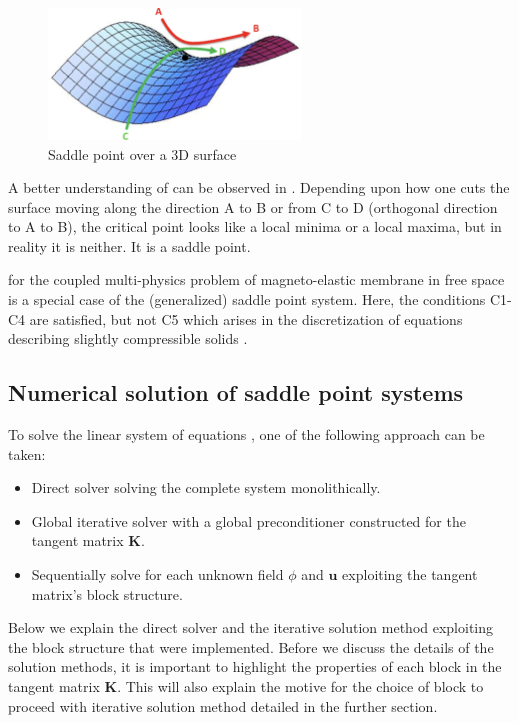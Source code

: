 \documentclass[11pt,a4paper,final]{article}
\begin{document}
\begin{figure}[h]
\centering
\includegraphics[width=0.6\textwidth]{saddle_point_problem.png}
\caption{Saddle point over a 3D surface \cite{Buduma_book}}
\label{fig:3.1}
\end{figure}

A better understanding of  can be observed in . Depending upon how one cuts the surface moving along the direction A to B or from C to D (orthogonal direction to A to B), the critical point looks like a local minima or a local maxima, but in reality it is neither. It is a saddle point. \par 

 for the coupled multi-physics problem of magneto-elastic membrane in free space is a special case of the (generalized) saddle point system. Here, the conditions C1-C4 are satisfied, but not C5 which arises in the discretization of equations describing slightly compressible solids \cite{Benzi2005}.

\subsection{Numerical solution of saddle point systems}

To solve the linear system of equations , one of the following approach can be taken:
\begin{itemize}
\item Direct solver solving the complete system monolithically.
\item Global iterative solver with a global preconditioner constructed for the tangent matrix $\mathbf{K}$.
\item Sequentially solve for each unknown field $\phi$ and $\mathbf{u}$ exploiting the tangent matrix's block structure.
\end{itemize}
Below we explain the direct solver and the iterative solution method exploiting the block structure that were implemented. Before we discuss the details of the solution methods, it is important to highlight the properties of each block in the tangent matrix $\mathbf{K}$. This will also explain the motive for the choice of block to proceed with iterative solution method detailed in the further section.\par 
\end{document}
